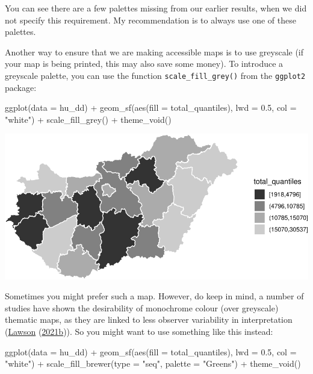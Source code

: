 \documentclass[
]{book}
\makeatletter
\newenvironment{Shaded}{\begin{snugshade}}{\end{snugshade}}
\newcommand{\AttributeTok}[1]{\textcolor[rgb]{0.61,0.61,0.61}{#1}}
\newcommand{\FloatTok}[1]{\textcolor[rgb]{0.06,0.06,0.06}{#1}}
\newcommand{\FunctionTok}[1]{\textcolor[rgb]{0,0,0}{#1}}
\newcommand{\NormalTok}[1]{#1}
\newcommand{\SpecialCharTok}[1]{\textcolor[rgb]{0,0,0}{#1}}
\newcommand{\StringTok}[1]{\textcolor[rgb]{0.5,0.5,0.5}{#1}}
\newenvironment{kframe}{%
\medskip{}
\setlength{\fboxsep}{.8em}
 \def\at@end@of@kframe{}%
 \ifinner\ifhmode%
  \def\at@end@of@kframe{\end{minipage}}%
  \begin{minipage}{\columnwidth}%
 \fi\fi%
 \def\FrameCommand##1{\hskip\@totalleftmargin \hskip-\fboxsep
 \colorbox{shadecolor}{##1}\hskip-\fboxsep
     \hskip-\linewidth \hskip-\@totalleftmargin \hskip\columnwidth}%
 \MakeFramed {\advance\hsize-\width
   \@totalleftmargin\z@ \linewidth\hsize
   \@setminipage}}%
 {\par\unskip\endMakeFramed%
 \at@end@of@kframe}
\renewenvironment{Shaded}{\begin{kframe}}{\end{kframe}}
\makeatother
\begin{document}
You can see there are a few palettes missing from our earlier results, when we did not specify this requirement. My recommendation is to always use one of these palettes.

Another way to ensure that we are making accessible maps is to use greyscale (if your map is being printed, this may also save some money). To introduce a greyscale palette, you can use the function \texttt{scale\_fill\_grey()} from the \texttt{ggplot2} package:

\begin{Shaded}
\begin{Highlighting}[]
\FunctionTok{ggplot}\NormalTok{(}\AttributeTok{data =}\NormalTok{ hu\_dd) }\SpecialCharTok{+} 
  \FunctionTok{geom\_sf}\NormalTok{(}\FunctionTok{aes}\NormalTok{(}\AttributeTok{fill =}\NormalTok{ total\_quantiles), }\AttributeTok{lwd =} \FloatTok{0.5}\NormalTok{, }\AttributeTok{col =} \StringTok{"white"}\NormalTok{) }\SpecialCharTok{+} 
  \FunctionTok{scale\_fill\_grey}\NormalTok{() }\SpecialCharTok{+} 
  \FunctionTok{theme\_void}\NormalTok{()}
\end{Highlighting}
\end{Shaded}

\includegraphics{crime_mapping_files/figure-latex/greyscaletestsmap-1.pdf}

Sometimes you might prefer such a map. However, do keep in mind, a number of studies have shown the desirability of monochrome colour (over greyscale) thematic maps, as they are linked to less observer variability in interpretation (\protect\hyperlink{ref-Lawson_2006}{Lawson} (\protect\hyperlink{ref-Lawson_2006}{2021b})). So you might want to use something like this instead:

\begin{Shaded}
\begin{Highlighting}[]
\FunctionTok{ggplot}\NormalTok{(}\AttributeTok{data =}\NormalTok{ hu\_dd) }\SpecialCharTok{+} 
  \FunctionTok{geom\_sf}\NormalTok{(}\FunctionTok{aes}\NormalTok{(}\AttributeTok{fill =}\NormalTok{ total\_quantiles), }\AttributeTok{lwd =} \FloatTok{0.5}\NormalTok{, }\AttributeTok{col =} \StringTok{"white"}\NormalTok{) }\SpecialCharTok{+} 
  \FunctionTok{scale\_fill\_brewer}\NormalTok{(}\AttributeTok{type =} \StringTok{"seq"}\NormalTok{, }\AttributeTok{palette =} \StringTok{"Greens"}\NormalTok{) }\SpecialCharTok{+} 
  \FunctionTok{theme\_void}\NormalTok{()}
\end{Highlighting}
\end{Shaded}
\end{document}

